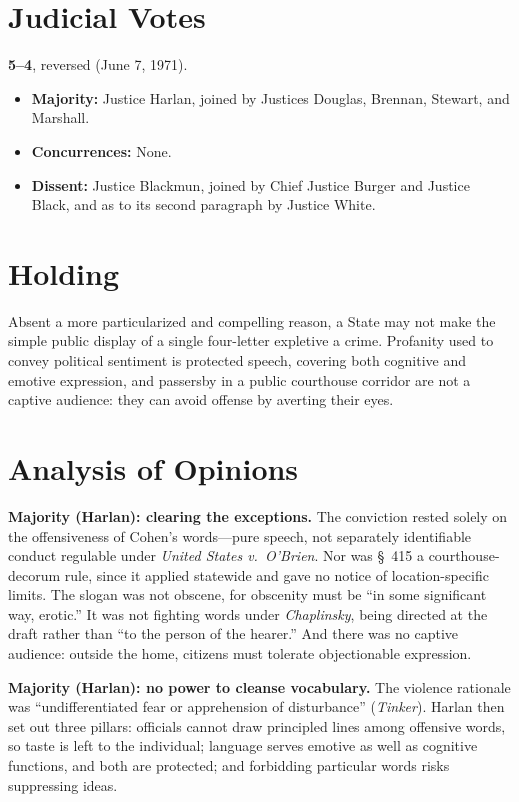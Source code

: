 \documentclass[12pt]{article}
\begin{document}
\section{Judicial Votes}

\textbf{5--4}, reversed (June 7, 1971).
\begin{itemize}
\item \textbf{Majority:} Justice Harlan, joined by Justices Douglas, Brennan, Stewart, and Marshall.
\item \textbf{Concurrences:} None.
\item \textbf{Dissent:} Justice Blackmun, joined by Chief Justice Burger and Justice Black, and as to its second paragraph by Justice White.
\end{itemize}

\section{Holding}

Absent a more particularized and compelling reason, a State may not make the simple public display of a single four-letter expletive a crime. Profanity used to convey political sentiment is protected speech, covering both cognitive and emotive expression, and passersby in a public courthouse corridor are not a captive audience: they can avoid offense by averting their eyes.

\section{Analysis of Opinions}

\textbf{Majority (Harlan): clearing the exceptions.} The conviction rested solely on the offensiveness of Cohen's words---pure speech, not separately identifiable conduct regulable under \textit{United States v.\ O'Brien}. Nor was \S~415 a courthouse-decorum rule, since it applied statewide and gave no notice of location-specific limits. The slogan was not obscene, for obscenity must be ``in some significant way, erotic.'' It was not fighting words under \textit{Chaplinsky}, being directed at the draft rather than ``to the person of the hearer.'' And there was no captive audience: outside the home, citizens must tolerate objectionable expression.

\textbf{Majority (Harlan): no power to cleanse vocabulary.} The violence rationale was ``undifferentiated fear or apprehension of disturbance'' (\textit{Tinker}). Harlan then set out three pillars: officials cannot draw principled lines among offensive words, so taste is left to the individual; language serves emotive as well as cognitive functions, and both are protected; and forbidding particular words risks suppressing ideas.
\end{document}
